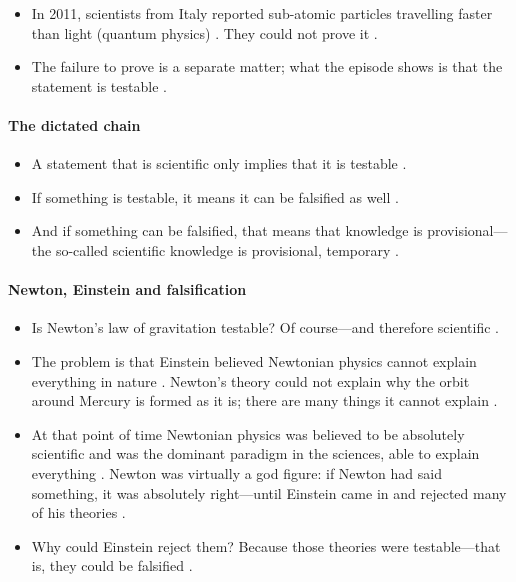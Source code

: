 \begin{DataFact}
\begin{itemize}
    \item In 2011, scientists from Italy reported sub-atomic particles travelling faster than light (quantum physics) . They could not prove it .
    \item The failure to prove is a separate matter; what the episode shows is that the statement is testable .
\end{itemize}
\end{DataFact}

\paragraph{The dictated chain}
\begin{itemize}
    \item A statement that is scientific only implies that it is testable .
    \item If something is testable, it means it can be falsified as well .
    \item And if something can be falsified, that means that knowledge is provisional---the so-called scientific knowledge is provisional, temporary .
\end{itemize}

\paragraph{Newton, Einstein and falsification}
\begin{itemize}
    \item Is Newton's law of gravitation testable? Of course---and therefore scientific .
    \item The problem is that Einstein believed Newtonian physics cannot explain everything in nature . Newton's theory could not explain why the orbit around Mercury is formed as it is; there are many things it cannot explain .
    \item At that point of time Newtonian physics was believed to be absolutely scientific and was the dominant paradigm in the sciences, able to explain everything . Newton was virtually a god figure: if Newton had said something, it was absolutely right---until Einstein came in and rejected many of his theories .
    \item Why could Einstein reject them? Because those theories were testable---that is, they could be falsified .
\end{itemize}

